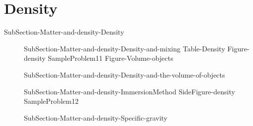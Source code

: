 \documentclass[main.tex]{subfiles}
\begin{document}
\section{Density}{SubSection-Matter-and-density-Density}
\sloppy\begin{description}
\item[]{SubSection-Matter-and-density-Density-and-mixing}
{Table-Density} 
{Figure-density} 
{SampleProblem11}%
{Figure-Volume-objects}
\item[]{SubSection-Matter-and-density-Density-and-the-volume-of-objects}
\item[]{SubSection-Matter-and-density-ImmersionMethod}
{SideFigure-density}
{SampleProblem12}%
\item[]{SubSection-Matter-and-density-Specific-gravity}

 
\end{description}


 \checkoddpage\ifoddpage \clearpage\thispagestyle{empty}\mbox{}\clearpage \else  \fi 
\end{document}
